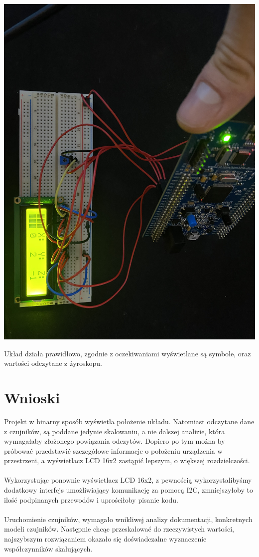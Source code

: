 \documentclass[12pt]{article}
\let\origfigure\figure
\let\endorigfigure\endfigure
\renewenvironment{figure}[1][2] {
    \expandafter\origfigure\expandafter[H]
} {
    \endorigfigure
}
\begin{document}
\begin{figure}[H]
\begin{floatrow}
{  \includegraphics[angle=90,origin=c, width=\linewidth]{images/przechyl_w_przod.jpg}
}{%
  \caption{Wynik działania w przechyleniu w przód}%
}
\end{floatrow}
\end{figure}

Układ działa prawidłowo, zgodnie z oczekiwaniami wyświetlane są symbole, oraz wartości odczytane z żyroskopu.

\section{Wnioski}

Projekt w binarny sposób wyświetla położenie układu. Natomiast odczytane dane z czujników, są poddane jedynie skalowaniu, a nie dalszej analizie, która wymagałaby złożonego powiązania odczytów. Dopiero po tym można by próbować przedstawić szczegółowe informacje o położeniu urządzenia w przestrzeni, a wyświetlacz LCD 16x2 zastąpić lepszym, o większej rozdzielczości.
\\
\\
Wykorzystując ponownie wyświetlacz LCD 16x2, z pewnością wykorzystalibyśmy dodatkowy interfejs umożliwiający komunikację za pomocą I2C, zmniejszyłoby to ilość podpinanych przewodów i uprościłoby pisanie kodu.
\\
\\
Uruchomienie czujników, wymagało wnikliwej analizy dokumentacji, konkretnych modeli czujników. Następnie chcąc przeskalować do rzeczywistych wartości, najszybszym rozwiązaniem okazało się doświadczalne wyznaczenie współczynników skalujących.
\end{document}

